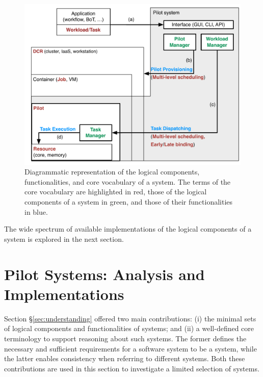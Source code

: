 \documentclass{sig-alternate}
\begin{document}
\begin{figure}[t]
    \centering
        \includegraphics[width=.48\textwidth]{figures/core_vocabulary.pdf}
    \caption{Diagrammatic representation of the logical components,
    functionalities, and core vocabulary of a \pilot system. The terms of the
    core vocabulary are highlighted in red, those of the logical components of
    a \pilot system in green, and those of their functionalities in blue.}
    \label{fig:core_vocabulary}
\end{figure}


The wide spectrum of available implementations of the logical components of a
\pilot system is explored in the next section.


\section{Pilot Systems: Analysis and Implementations}
\label{sec:analysis}

Section \S\ref{sec:understanding} offered two main contributions: (i) the
minimal sets of logical components and functionalities of \pilot systems; and
(ii) a well-defined core terminology to support reasoning about such systems.
The former defines the necessary and sufficient requirements for a software
system to be a \pilot system, while the latter enables consistency when
referring to different \pilot systems. Both these contributions are used in this
section to investigate a limited selection of \pilot systems.
\end{document}
